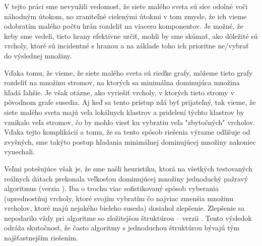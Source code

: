 V tejto práci sme nevyužili vedomosť, že siete malého sveta sú síce odolné voči 
náhodným útokom, no zraniteľné cielenými útokmi v tom zmysle, že ich vieme 
odobratím malého počtu hrán rozdeliť na viacero komponentov. Je možné, že keby 
sme vedeli, tieto hrany efektívne určiť, mohli by sme skúmať, ako dôležité sú 
vrcholy, ktoré sú incidentné s hranou a na základe toho ich prioritne ne/vybrať 
do výslednej množiny.

Vďaka tomu, že vieme, že siete malého sveta sú riedke grafy, môžeme tieto grafy 
rozdeliť na množinu stromov, na ktorých sa minimálna dominujúca množina hľadá 
ľahšie. Je však otázne, ako vyriešiť vrcholy, v ktorých tieto stromy v pôvodnom 
grafe susedia. Aj keď sa tento prístup zdá byť prijateľný, tak vieme, že siete 
malého sveta majú veľa lokálnych klastrov a pridelení týchto klastrov by 
vznikalo veľa stromov, čo by mohlo viesť ku vybratiu veľa "zbytočných" 
vrcholov. Vďaka tejto komplikácií a tomu, že sa tento spôsob riešenia výrazne 
odlišuje od zvyšných, sme takýto postup hľadania minimálnej dominujúcej množiny 
nakoniec vynechali.

Veľmi potešujúce však je, že sme našli heuristiku, ktorá na všetkých 
testovaných reálnych dátach prekonala veľkosťou dominujúcej množiny 
jednoduchý pažravý algoritmus (verzia ). Iba o trochu viac 
sofistikovaný spôsob vyberania (uprednostňuj vrcholy, ktoré svojím vybratím 
čo najviac zmenšia množinu vrcholov, ktoré majú nejakého bieleho suseda) 
dosiahol zlepšenie. Zlepšenie sa nepodarilo vždy pri algoritme so zložitejšou 
štruktúrou -- verzii .
Tento výsledok odráža skutočnosť, že často algoritmy s 
jednoduchou štruktúrou bývajú tým najšťastnejším riešením.

\begin{comment}
dátové štruktúry union-find, písmenkový strom a sufixový 
strom (kapitoly~\ref{chap:uf}, \ref{chap:trie} a \ref{chap:sx}). Spísali sme 
návrh a implementáciu softvéru. Softvér sme implementovali 
podľa návrhu a splnili sme všetku funkcionalitu: vizualizovali sme všetky 
dátové štruktúry a algoritmy, doplnili funkčnosť, spravili komentáre v 
angličtine a slovenčine.

V ďalšom vývoji by sme chceli prerobiť komentáre pre sufixové stromy, keďže sa 
nám zdajú byť neprehľadné. Taktiež by sme chceli zvýrazniť niektoré časti 
Ukkonenovho algoritmu a pridať nové algoritmy vymenované v sekcií 
\ref{sec:sx:usage}.

Softvér by sme chceli v budúcnosti rozšíriť o nové dátové štruktúry, ktoré sa 
týkajú stringológie, napríklad \emph{radix tree}, \emph{PATRICIA}, 
\emph{orientovaný acyklický graf pre slová (DAWG)}, \emph{všeobecný sufixový 
strom}.

Chceli by sme projekt podstúpiť širšiemu použitiu a zozbierať viac spätnej 
väzby, aby sme softvér odladili podľa používateľských potrieb a opravili 
chyby, ktoré sme neobjavili. 
\end{comment}


\cleardoublepage
{}
{}

\printbibliography

\backmatter

\newpage
\pagestyle{empty}
\hbox{}